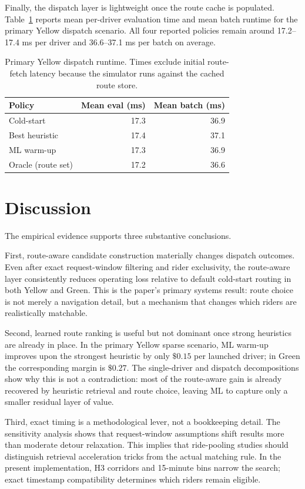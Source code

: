 \documentclass[journal]{IEEEtran}
\begin{document}
Finally, the dispatch layer is lightweight once the route cache is populated. Table~\ref{tab:runtime} reports mean per-driver evaluation time and mean batch runtime for the primary Yellow dispatch scenario. All four reported policies remain around 17.2--17.4 ms per driver and 36.6--37.1 ms per batch on average.

\begin{table}[!t]
\caption{Primary Yellow dispatch runtime. Times exclude initial route-fetch latency because the simulator runs against the cached route store.}
\label{tab:runtime}
\centering
\scriptsize
\setlength{\tabcolsep}{4.0pt}
\begin{tabular}{lrr}
\toprule
Policy & Mean eval (ms) & Mean batch (ms) \\
\midrule
Cold-start & 17.3 & 36.9 \\
Best heuristic & 17.4 & 37.1 \\
ML warm-up & 17.3 & 36.9 \\
Oracle (route set) & 17.2 & 36.6 \\
\bottomrule
\end{tabular}
\end{table}

\section{Discussion}
The empirical evidence supports three substantive conclusions.

First, route-aware candidate construction materially changes dispatch outcomes. Even after exact request-window filtering and rider exclusivity, the route-aware layer consistently reduces operating loss relative to default cold-start routing in both Yellow and Green. This is the paper's primary systems result: route choice is not merely a navigation detail, but a mechanism that changes which riders are realistically matchable.

Second, learned route ranking is useful but not dominant once strong heuristics are already in place. In the primary Yellow sparse scenario, ML warm-up improves upon the strongest heuristic by only \(\$0.15\) per launched driver; in Green the corresponding margin is \(\$0.27\). The single-driver and dispatch decompositions show why this is not a contradiction: most of the route-aware gain is already recovered by heuristic retrieval and route choice, leaving ML to capture only a smaller residual layer of value.

Third, exact timing is a methodological lever, not a bookkeeping detail. The sensitivity analysis shows that request-window assumptions shift results more than moderate detour relaxation. This implies that ride-pooling studies should distinguish retrieval acceleration tricks from the actual matching rule. In the present implementation, H3 corridors and 15-minute bins narrow the search; exact timestamp compatibility determines which riders remain eligible.
\end{document}
